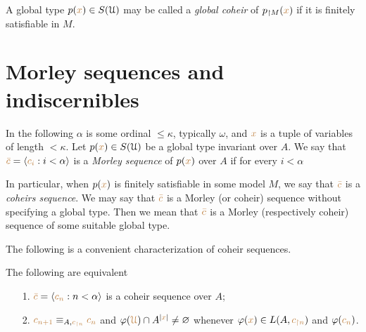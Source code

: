 \documentclass[creche.tex]{subfiles}
\begin{document}
A global type $p({\color{brown} x})\in S(\EuScript U)$ may be called a \emph{global coheir\/} of $p_{\restriction M}({\color{brown} x})$ if it is finitely satisfiable in $M$.

% 


\section{Morley sequences and indiscernibles}


In the following $\alpha$ is some ordinal $\le\kappa$, typically $\omega$, and ${\color{brown} x}$ is a tuple of variables of length $<\kappa$. Let \mbox{$p({\color{brown} x})\in S(\EuScript U)$} be a global type invariant over $A$.   We say that ${\color{brown}\bar c}=\langle{\color{brown}c_i}:i<\alpha\rangle$ is a \emph{Morley sequence\/} of $p({\color{brown} x})$ over $A$ if for every $i<\alpha$


In particular, when $p({\color{brown} x})$ is finitely satisfiable in some model $M$, we say that ${\color{brown}\bar c}$ is a \emph{coheirs sequence}. We may say that ${\color{brown}\bar c}$ is a Morley (or coheir) sequence without specifying a global type. Then we mean that ${\color{brown}\bar c}$ is a Morley (respectively coheir) sequence of some suitable global type.

The following is a convenient characterization of coheir sequences.

\begin{lemma}\label{lem_coheir_property}
The following are equivalent
\begin{itemize}
\item[1.] ${\color{brown}\bar c}=\langle{\color{brown}c_n}:n<\alpha\rangle$ is a coheir sequence over $A$;
\item[2.] ${\color{brown} c_{n+1}}\equiv_{A,{\color{brown} c_{\restriction n}}}{\color{brown} c_n}$ and $\varphi({\color{brown}\EuScript U})\cap A^{|{\color{brown} x}|}\neq\varnothing$ whenever $\varphi({\color{brown} x})\in L(A,{\color{brown} c_{\restriction n}})$ and  $\varphi({\color{brown} c_n})$.
\end{itemize}
\end{lemma}
\end{document}
